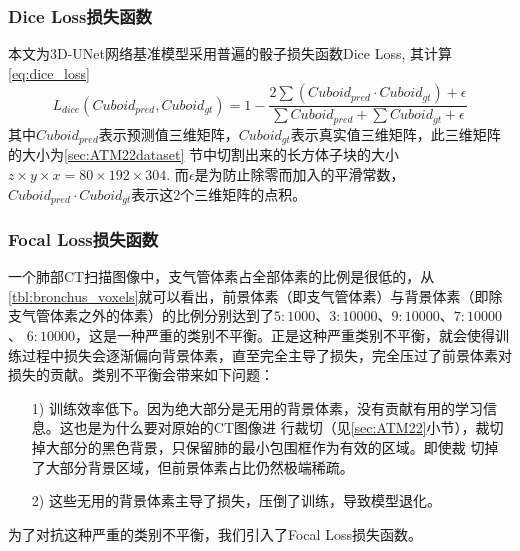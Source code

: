 \subsubsection{Dice Loss损失函数}
本文为3D-UNet网络基准模型采用普遍的骰子损失函数Dice Loss, 其计算\autoref{eq:dice_loss}
\begin{equation}\label{eq:dice_loss}
    L_{dice}\left(Cuboid_{pred}, Cuboid_{gt}\right) = 1 - \frac{2\sum{\left(Cuboid_{pred} \cdot Cuboid_{gt}\right)} + \epsilon}
    {\sum{Cuboid_{pred}} + \sum{Cuboid_{gt}} + \epsilon}
\end{equation}
其中${Cuboid}_{pred}$表示预测值三维矩阵，${Cuboid}_{gt}$表示真实值三维矩阵，此三维矩阵的大小为\ref{sec:ATM22dataset}
节中切割出来的长方体子块的大小$z \times y \times x = 80 \times 192 \times 304$. 而$\epsilon$是为防止除零而加入的平滑常数，
$Cuboid_{pred} \cdot Cuboid_{gt}$表示这2个三维矩阵的点积。

\subsubsection{Focal Loss损失函数}

一个肺部CT扫描图像中，支气管体素占全部体素的比例是很低的，从\autoref{tbl:bronchus_voxels}就可以看出，前景体素（即支气管体素）与背景体素（即除支气管体素之外的体素）的比例分别达到了$5:1000$、$3:10000$、$9:10000$、$7:10000$、 $6:10000$，这是一种严重的类别不平衡。正是这种严重类别不平衡，就会使得训练过程中损失会逐渐偏向背景体素，直至完全主导了损失，完全压过了前景体素对损失的贡献。类别不平衡会带来如下问题：
\begin{enumerate}
	\item[1)]训练效率低下。因为绝大部分是无用的背景体素，没有贡献有用的学习信息。这也是为什么要对原始的CT图像进
					行裁切（见\ref{sec:ATM22}小节），裁切掉大部分的黑色背景，只保留肺的最小包围框作为有效的区域。即使裁
					切掉了大部分背景区域，但前景体素占比仍然极端稀疏。
	\item[2)]这些无用的背景体素主导了损失，压倒了训练，导致模型退化。
\end{enumerate}
为了对抗这种严重的类别不平衡，我们引入了Focal Loss损失函数\cite{Lin2017FocalLF}。

